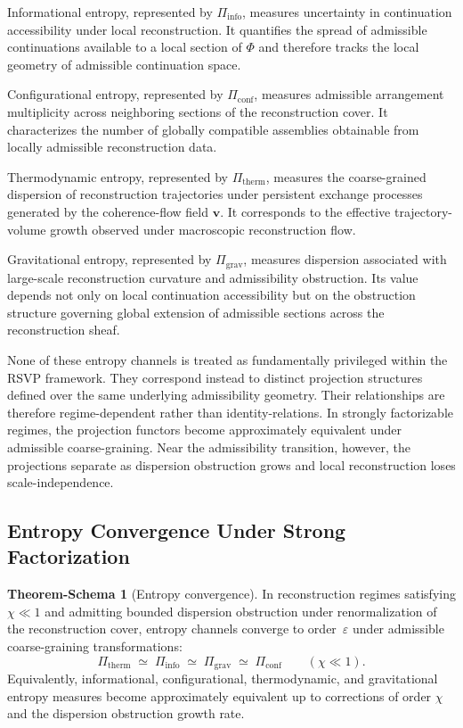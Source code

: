 \documentclass[11pt, a4paper]{article}
\theoremstyle{plain}
\theoremstyle{definition}
\newtheorem{tschema}[theorem]{Theorem-Schema}
\theoremstyle{remark}
\newcommand{\Pitherm}{\Pi_{\mathrm{therm}}}
\newcommand{\Piinfo}{\Pi_{\mathrm{info}}}
\newcommand{\Pigrav}{\Pi_{\mathrm{grav}}}
\newcommand{\Piconf}{\Pi_{\mathrm{conf}}}
\begin{document}
Informational entropy, represented by $\Pi_{\mathrm{info}}$, measures uncertainty in
continuation accessibility under local reconstruction.  It quantifies the spread of
admissible continuations available to a local section of $\Phi$ and therefore tracks
the local geometry of admissible continuation space.

Configurational entropy, represented by $\Pi_{\mathrm{conf}}$, measures admissible
arrangement multiplicity across neighboring sections of the reconstruction cover.
It characterizes the number of globally compatible assemblies obtainable from locally
admissible reconstruction data.

Thermodynamic entropy, represented by $\Pi_{\mathrm{therm}}$, measures the
coarse-grained dispersion of reconstruction trajectories under persistent exchange
processes generated by the coherence-flow field $\mathbf{v}$.  It corresponds to the
effective trajectory-volume growth observed under macroscopic reconstruction flow.

Gravitational entropy, represented by $\Pi_{\mathrm{grav}}$, measures dispersion
associated with large-scale reconstruction curvature and admissibility obstruction.
Its value depends not only on local continuation accessibility but on the obstruction
structure governing global extension of admissible sections across the reconstruction
sheaf.

None of these entropy channels is treated as fundamentally privileged within the
RSVP framework.  They correspond instead to distinct projection structures defined
over the same underlying admissibility geometry.  Their relationships are therefore
regime-dependent rather than identity-relations.  In strongly factorizable regimes,
the projection functors become approximately equivalent under admissible
coarse-graining.  Near the admissibility transition, however, the projections
separate as dispersion obstruction grows and local reconstruction loses
scale-independence.

\subsection{Entropy Convergence Under Strong Factorization}

\begin{tschema}[Entropy convergence]
\label{ts:convergence}
In reconstruction regimes satisfying $\chi \ll 1$ and admitting bounded dispersion
obstruction under renormalization of the reconstruction cover, entropy channels
converge to order~$\varepsilon$ under admissible coarse-graining transformations:
\[
  \Pitherm \;\simeq\; \Piinfo \;\simeq\; \Pigrav \;\simeq\; \Piconf
  \qquad (\chi \ll 1).
\]
Equivalently, informational, configurational, thermodynamic, and gravitational
entropy measures become approximately equivalent up to corrections of order $\chi$
and the dispersion obstruction growth rate.
\end{tschema}
\end{document}
